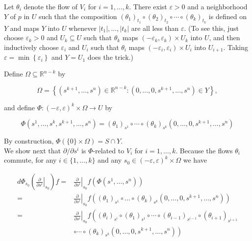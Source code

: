 \documentclass[10pt]{article}
\begin{document}
Let $\theta_{i}$ denote the flow of $V_{i}$ for $i=1, \ldots, k$. There exist $\varepsilon>0$ and a neighborhood $Y$ of $p$ in $U$ such that the composition $\left(\theta_{1}\right)_{t_{1}} \circ\left(\theta_{2}\right)_{t_{2}} \circ \cdots \circ\left(\theta_{k}\right)_{t_{k}}$ is defined on $Y$ and maps $Y$ into $U$ whenever $\left|t_{1}\right|, \ldots,\left|t_{k}\right|$ are all less than $\varepsilon$. (To see this, just choose $\varepsilon_{k}>0$ and $U_{k} \subseteq U$ such that $\theta_{k}$ maps $\left(-\varepsilon_{k}, \varepsilon_{k}\right) \times U_{k}$ into $U$, and then inductively choose $\varepsilon_{i}$ and $U_{i}$ such that $\theta_{i}$ maps $\left(-\varepsilon_{i}, \varepsilon_{i}\right) \times U_{i}$ into $U_{i+1}$. Taking $\varepsilon=\min \left\{\varepsilon_{i}\right\}$ and $Y=U_{1}$ does the trick.)

Define $\Omega \subseteq \mathbb{R}^{n-k}$ by

$$
\Omega=\left\{\left(s^{k+1}, \ldots, s^{n}\right) \in \mathbb{R}^{n-k}:\left(0, \ldots, 0, s^{k+1}, \ldots, s^{n}\right) \in Y\right\},
$$

and define $\Phi:(-\varepsilon, \varepsilon)^{k} \times \Omega \rightarrow U$ by

$$
\Phi\left(s^{1}, \ldots, s^{k}, s^{k+1}, \ldots, s^{n}\right)=\left(\theta_{1}\right)_{s^{1}} \circ \cdots \circ\left(\theta_{k}\right)_{s^{k}}\left(0, \ldots, 0, s^{k+1}, \ldots, s^{n}\right)
$$

By construction, $\Phi(\{0\} \times \Omega)=S \cap Y$.\\
We show next that $\partial / \partial s^{i}$ is $\Phi$-related to $V_{i}$ for $i=1, \ldots, k$. Because the flows $\theta_{i}$ commute, for any $i \in\{1, \ldots, k\}$ and any $s_{0} \in(-\varepsilon, \varepsilon)^{k} \times \Omega$ we have

$$
\begin{aligned}
d \Phi_{s_{0}}\left(\left.\frac{\partial}{\partial s^{i}}\right|_{s_{0}}\right) f= & \left.\frac{\partial}{\partial s^{i}}\right|_{s_{0}} f\left(\Phi\left(s^{1}, \ldots, s^{n}\right)\right) \\
= & \left.\frac{\partial}{\partial s^{i}}\right|_{s_{0}} f\left(\left(\theta_{1}\right)_{s^{1}} \circ \ldots \circ\left(\theta_{k}\right)_{s^{k}}\left(0, \ldots, 0, s^{k+1}, \ldots, s^{n}\right)\right) \\
= & \left.\frac{\partial}{\partial s^{i}}\right|_{s_{0}} f\left(\left(\theta_{i}\right)_{s^{i}} \circ\left(\theta_{1}\right)_{s^{1}} \circ \cdots \circ\left(\theta_{i-1}\right)_{s^{i-1}} \circ\left(\theta_{i+1}\right)_{s^{i+1}}\right. \\
& \left.\circ \cdots \circ\left(\theta_{k}\right)_{s^{k}}\left(0, \ldots, 0, s^{k+1}, \ldots, s^{n}\right)\right)
\end{aligned}
$$
\end{document}
